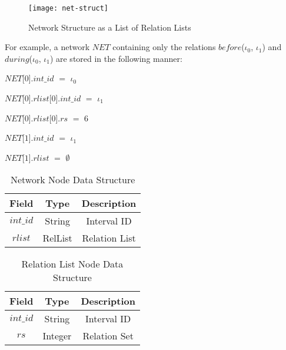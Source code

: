 \documentclass[11pt]{report}
\newenvironment{vquote}
{
  \begin{list}{}{\leftmargin 1em}\item[]
}
{
  \end{list}
}
\begin{document}
          \begin{figure}[[tbhp]
            \begin{center}
              \texttt{[image: net-struct]}
              \caption{Network Structure as a List of Relation Lists}
              \label{fig-net-struct}
            \end{center}
          \end{figure}

          For example, a network $NET$ containing only the relations
          $before$($\iota_0$, $\iota_1$) and $during$($\iota_0$, $\iota_1$) are
          stored in the following manner:

          \begin{vquote}
            $NET$[$0$].$int\_id$ $=$ $\iota_0$

            $NET$[$0$].$rlist$[$0$].$int\_id$ $=$ $\iota_1$

            $NET$[$0$].$rlist$[$0$].$rs$ $=$ $6$

            $NET$[$1$].$int\_id$ $=$ $\iota_1$

            $NET$[$1$].$rlist$ $=$ $\emptyset$
          \end{vquote}

          \begin{table}[tbhp]
            \begin{center}
              \begin{tabular}[t]{|c|c|c|}
                \hline
                {\bf Field} & {\bf Type} & {\bf Description} \\
                \hline
                $int\_id$ & String & Interval ID \\
                \hline
                $rlist$   & RelList & Relation List \\
                \hline
              \end{tabular}
            \end{center}
            \caption[]{Network Node Data Structure}
            \label{table-net-ds}
          \end{table}

          \begin{table}[tbhp]
            \begin{center}
              \begin{tabular}[t]{|c|c|c|}
                \hline
                {\bf Field} & {\bf Type} & {\bf Description} \\
                \hline
                $int\_id$ & String & Interval ID \\
                \hline
                $rs$      & Integer & Relation Set \\
                \hline
              \end{tabular}
            \end{center}
            \caption[]{Relation List Node Data Structure}
            \label{table-rlist-ds}
          \end{table}
\end{document}
